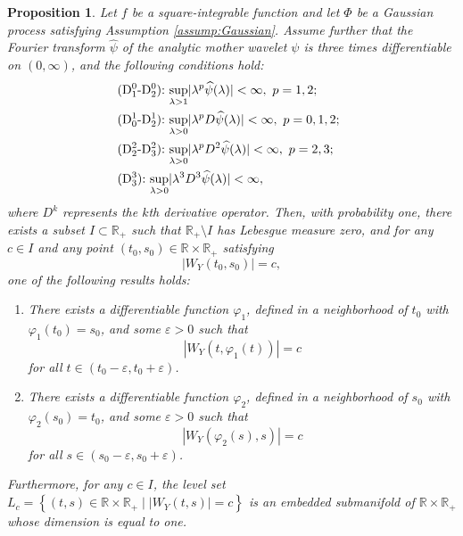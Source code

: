 \documentclass{amsart}
\newtheorem{Proposition}{Proposition}
\newtheorem{Lemma}{Lemma}
\begin{document}








\begin{Proposition}\label{thm:contour:c1}
Let $f$ be a square-integrable function and let $\Phi$ be a Gaussian process satisfying Assumption \ref{assump:Gaussian}.
Assume further that the Fourier transform $\widehat{\psi}$ of the analytic mother wavelet $\psi$ is
three times differentiable on $(0,\infty)$, and the following conditions hold:
\begin{align*}
&\textup{($\mathrm{D}^{0}_{1}$-$\mathrm{D}^{0}_2$):}\  \underset{\lambda>1}{\sup}|\lambda^{p}\widehat{\psi}(\lambda)|<\infty,\ p=1,2;\ \ \
\\&\textup{($\mathrm{D}^{1}_{0}$-$\mathrm{D}^{1}_2$):}\  \underset{\lambda>0}{\sup}|\lambda^{p}D\widehat{\psi}(\lambda)|<\infty,\ p=0,1,2;
\\
&\textup{($\mathrm{D}^{2}_2$-$\mathrm{D}^{2}_3$):}\  \underset{\lambda>0}{\sup}|\lambda^{p}D^{2}\widehat{\psi}(\lambda)|<\infty,\ p=2,3;\ \ \
\\&\textup{($\mathrm{D}^{3}_3$):}\  \underset{\lambda>0}{\sup}|\lambda^{3}D^{3}\widehat{\psi}(\lambda)|<\infty,
\end{align*}
where $D^{k}$ represents the $k$th derivative operator.
Then, with probability one, there exists a subset $I\subset \mathbb{R}_{+}$ such that
$\mathbb{R}_{+}\setminus I$ has Lebesgue measure zero, and for any $c\in I$ and any point $(t_{0},s_{0})\in \mathbb{R}\times \mathbb{R}_{+}$ satisfying
$$
|W_{Y}(t_0,s_0)| = c,
$$
one of the following results holds:
\begin{enumerate}
\item There exists a differentiable function $\varphi_{1}$, defined in a neighborhood of $t_0$ with $\varphi_{1}(t_{0})=s_{0}$, and some $\varepsilon>0$ such that
$$
|W_{Y}(t,\varphi_{1}(t))| = c
$$
for all $t\in (t_{0}-\varepsilon,t_{0}+\varepsilon)$.


\item There exists a differentiable function $\varphi_{2}$, defined in a neighborhood of $s_0$ with $\varphi_{2}(s_{0})=t_{0}$, and some $\varepsilon>0$ such that
$$
|W_{Y}(\varphi_{2}(s),s)| = c
$$
for all $s\in (s_{0}-\varepsilon,s_{0}+\varepsilon)$.
\end{enumerate}
Furthermore, for any $c\in I$, the level set
$L_c = \left\{(t, s) \in \mathbb{R}\times \mathbb{R}_{+}  \mid |W_Y(t, s)| = c\right\}$
is an embedded submanifold of $\mathbb{R}\times \mathbb{R}_{+}$ whose dimension is equal to one.
\end{Proposition}
\end{document}

